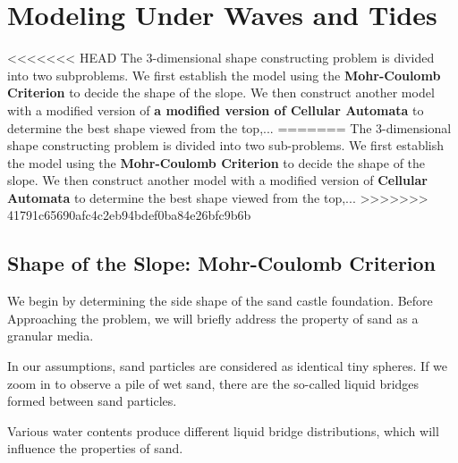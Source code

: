 \documentclass[12pt]{article}
\begin{document}
\section{Modeling Under Waves and Tides}

\par
<<<<<<< HEAD
The 3-dimensional shape constructing problem is divided into two subproblems. We first establish the model using the \textbf{Mohr-Coulomb Criterion} to decide the shape of the slope. We then construct another model with a modified version of \textbf{a modified version of Cellular Automata} to determine the best shape viewed from the top,...
=======
The 3-dimensional shape constructing problem is divided into two sub-problems. We first establish the model using the \textbf{Mohr-Coulomb Criterion} to decide the shape of the slope. We then construct another model with a modified version of \textbf{Cellular Automata} to determine the best shape viewed from the top,...
>>>>>>> 41791c65690afc4c2eb94bdef0ba84e26bfc9b6b

\subsection{Shape of the Slope: Mohr-Coulomb Criterion}


We begin by determining the side shape of the sand castle foundation. Before Approaching the problem, we will briefly address the property of sand as a granular media.
\par
In our assumptions, sand particles are considered as identical tiny spheres. If we zoom in to observe a pile of wet sand, there are the so-called liquid bridges formed between sand particles.
\par
Various water contents produce different liquid bridge distributions, which will influence the properties of sand.
\end{document}
